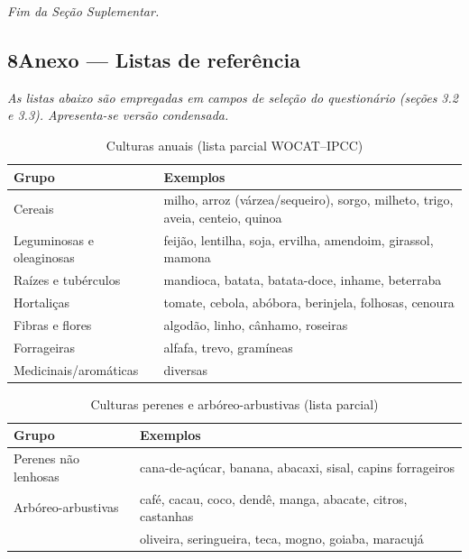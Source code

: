 \bigskip\noindent\textit{Fim da Seção Suplementar.}

\subsection*{8\quad Anexo --- Listas de referência}

\textit{As listas abaixo são empregadas em campos de seleção do questionário (seções 3.2 e 3.3). Apresenta-se versão condensada.}

\begin{table}[htbp]
\centering\small
\caption{Culturas anuais (lista parcial WOCAT--IPCC)}
\label{tab:app_annual_crops}
\begin{tabular}{ll}
\toprule
\textbf{Grupo} & \textbf{Exemplos} \\
\midrule
Cereais & milho, arroz (várzea/sequeiro), sorgo, milheto, trigo, aveia, centeio, quinoa \\
Leguminosas e oleaginosas & feijão, lentilha, soja, ervilha, amendoim, girassol, mamona \\
Raízes e tubérculos & mandioca, batata, batata-doce, inhame, beterraba \\
Hortaliças & tomate, cebola, abóbora, berinjela, folhosas, cenoura \\
Fibras e flores & algodão, linho, cânhamo, roseiras \\
Forrageiras & alfafa, trevo, gramíneas \\
Medicinais/aromáticas & diversas \\
\bottomrule
\end{tabular}
\end{table}

\begin{table}[htbp]
\centering\small
\caption{Culturas perenes e arbóreo-arbustivas (lista parcial)}
\label{tab:app_perennial_crops}
\begin{tabular}{ll}
\toprule
\textbf{Grupo} & \textbf{Exemplos} \\
\midrule
Perenes não lenhosas & cana-de-açúcar, banana, abacaxi, sisal, capins forrageiros \\
Arbóreo-arbustivas & café, cacau, coco, dendê, manga, abacate, citros, castanhas \\
& oliveira, seringueira, teca, mogno, goiaba, maracujá \\
\bottomrule
\end{tabular}
\end{table}

